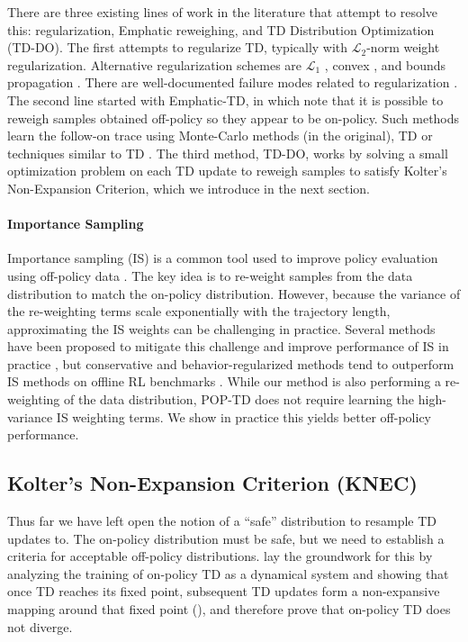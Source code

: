 There are three existing lines of work in the literature that attempt to resolve this: regularization, Emphatic reweighing, and TD Distribution Optimization (TD-DO).
The first attempts to regularize TD, typically with $\mathcal L_2$-norm weight regularization. Alternative regularization schemes are $\mathcal L_1$ \citep{mahadevan2014proximal}, convex \citep{yu2017convergence}, and bounds propagation \citep{kumar2020discor}. There are well-documented failure modes related to regularization \cite{manek2022pitfalls}.
The second line started with Emphatic-TD, in which \citet{sutton2016emphatic} note that it is possible to reweigh samples obtained off-policy so they appear to be on-policy. Such methods learn the follow-on trace using Monte-Carlo methods (in the original), TD \citep{jiang2021learning,zhang2020provably} or techniques similar to TD \citep{hasselt2021expected}. The third method, TD-DO, works by solving a small optimization problem on each TD update to reweigh samples to satisfy Kolter's Non-Expansion Criterion, which we introduce in the next section.

\paragraph{Importance Sampling}
Importance sampling (IS) is a common tool used to improve policy evaluation using off-policy data \citep{precup2000eligibility}.
The key idea is to re-weight samples from the data distribution to match the on-policy distribution.
However, because the variance of the re-weighting terms scale exponentially with the trajectory length, approximating the IS weights can be challenging in practice.
Several methods have been proposed to mitigate this challenge and improve performance of IS in practice \citep{hallak2017consistent, gelada2019off, nachum2019dualdice, nachum2019algaedice, liu2018breaking}, but conservative and behavior-regularized methods tend to outperform IS methods on offline RL benchmarks \citep{fu2020d4rl}.
While our method is also performing a re-weighting of the data distribution, POP-TD does not require learning the high-variance IS weighting terms.
We show in practice this yields better off-policy performance. 


\subsection{Kolter's Non-Expansion Criterion (KNEC)}
Thus far we have left open the notion of a ``safe'' distribution to resample TD updates to. The on-policy distribution must be safe, but we need to establish a criteria for acceptable off-policy distributions. \citeauthor{tsitsiklis1996analysis} lay the groundwork for this by analyzing the training of on-policy TD as a dynamical system and showing that once TD reaches its fixed point, subsequent TD updates form a non-expansive mapping around that fixed point (\citeyear[lemma 4]{tsitsiklis1996analysis}), and therefore prove that on-policy TD does not diverge. 

